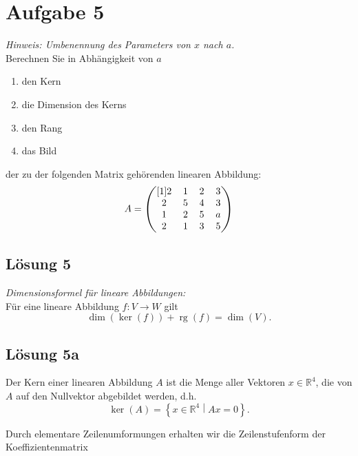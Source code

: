 \documentclass[main.tex]{subfiles}
\begin{document}
\section{Aufgabe 5}
\textit{Hinweis: Umbenennung des Parameters von $x$ nach $a$.}\\
Berechnen Sie in Abhängigkeit von $a$

\begin{enumerate}
    \item den Kern
    \item die Dimension des Kerns
    \item den Rang
    \item das Bild
\end{enumerate}
der zu der folgenden Matrix gehörenden linearen Abbildung:
$$
    \arraycolsep=0.6em
    A = \begin{pmatrix}[1]
        2 & 1 & 2 & 3 \\
        2 & 5 & 4 & 3 \\
        1 & 2 & 5 & a \\
        2 & 1 & 3 & 5
    \end{pmatrix}
$$

\subsection{Lösung 5}
\textit{Dimensionsformel für lineare Abbildungen:}\\
Für eine lineare Abbildung $f: V \to W$ gilt
$$
    \dim (\ker (f)) + \operatorname{rg}(f) = \dim (V).
$$

\subsection{Lösung 5a}

Der Kern einer linearen Abbildung $A$ ist die Menge aller Vektoren $x \in \mathbb{R}^4$, die von $A$ auf den Nullvektor abgebildet werden, d.h.
$$
    \ker (A) = \left\{ x\in \mathbb{R}^4 \middle| Ax=0 \right\}.
$$

Durch elementare Zeilenumformungen erhalten wir die Zeilenstufenform der Koeffizientenmatrix
\end{document}
